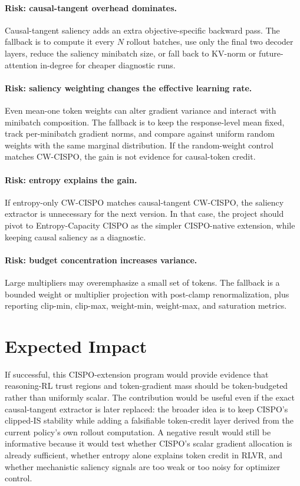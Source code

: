 \documentclass[11pt]{article}
\begin{document}
\paragraph{Risk: causal-tangent overhead dominates.}
Causal-tangent saliency adds an extra objective-specific backward pass. The
fallback is to compute it every $N$ rollout batches, use only the final two
decoder layers, reduce the saliency minibatch size, or fall back to KV-norm or
future-attention in-degree for cheaper diagnostic runs.

\paragraph{Risk: saliency weighting changes the effective learning rate.}
Even mean-one token weights can alter gradient variance and interact with
minibatch composition. The fallback is to keep the response-level mean fixed,
track per-minibatch gradient norms, and compare against uniform random weights
with the same marginal distribution. If the random-weight control matches
CW-CISPO, the gain is not evidence for causal-token credit.

\paragraph{Risk: entropy explains the gain.}
If entropy-only CW-CISPO matches causal-tangent CW-CISPO, the saliency
extractor is unnecessary for the next version. In that case, the project should
pivot to Entropy-Capacity CISPO as the simpler CISPO-native extension, while
keeping causal saliency as a diagnostic.

\paragraph{Risk: budget concentration increases variance.}
Large multipliers may overemphasize a small set of tokens. The fallback is a
bounded weight or multiplier projection with post-clamp renormalization, plus
reporting clip-min, clip-max, weight-min, weight-max, and saturation metrics.

\section{Expected Impact}

If successful, this CISPO-extension program would provide evidence that
reasoning-RL trust regions and token-gradient mass should be token-budgeted
rather than uniformly scalar.
The contribution would be useful even if the exact causal-tangent extractor is
later replaced: the broader idea is to keep CISPO's clipped-IS stability while
adding a falsifiable token-credit layer derived from the current policy's own
rollout computation. A negative result would still be informative because it
would test whether CISPO's scalar gradient allocation is already sufficient,
whether entropy alone explains token credit in RLVR, and whether mechanistic
saliency signals are too weak or too noisy for optimizer control.
\end{document}

